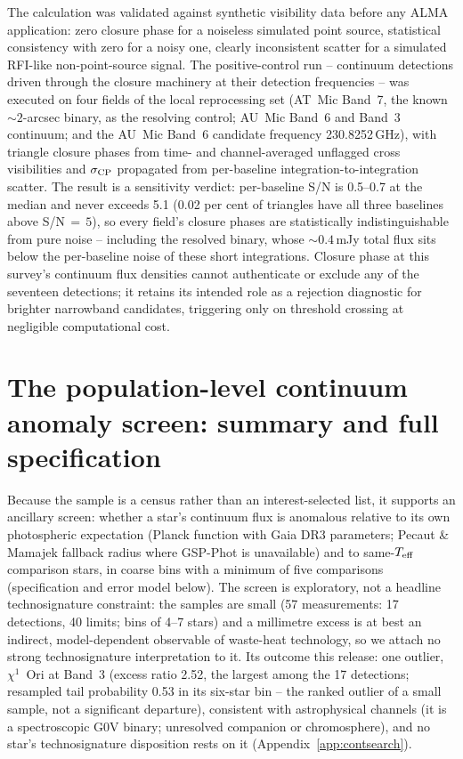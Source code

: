 \documentclass{openjournal}
\begin{document}
The calculation was validated against synthetic visibility data
before any ALMA application: zero closure phase for a noiseless
simulated point source, statistical consistency with zero for a noisy
one, clearly inconsistent scatter for a simulated RFI-like
non-point-source signal. The positive-control run -- continuum
detections driven through the closure machinery at their detection
frequencies -- was executed on four fields of the local reprocessing
set (AT~Mic Band~7, the known ${\sim}2$-arcsec binary, as the
resolving control; AU~Mic Band~6 and Band~3 continuum; and the AU~Mic
Band~6 candidate frequency 230.8252\,GHz), with triangle closure
phases from time- and channel-averaged unflagged cross visibilities
and $\sigma_{\rm CP}$ propagated from per-baseline
integration-to-integration scatter. The result is a sensitivity
verdict: per-baseline S/N is 0.5--0.7 at the median and never exceeds
5.1 (0.02 per cent of triangles have all three baselines above
S/N$\,{=}\,5$), so every field's closure phases are statistically
indistinguishable from pure noise -- including the resolved binary,
whose ${\sim}0.4$\,mJy total flux sits below the per-baseline noise of
these short integrations. Closure phase at this survey's continuum
flux densities cannot authenticate or exclude any of the seventeen
detections; it retains its intended role as a rejection diagnostic for
brighter narrowband candidates, triggering only on threshold crossing
at negligible computational cost.

\section{The population-level continuum anomaly screen: summary and full specification}
\label{app:continuum}

Because the sample is a census rather than an interest-selected list,
it supports an ancillary screen: whether a star's continuum flux is
anomalous relative to its own photospheric expectation (Planck
function with Gaia DR3 parameters; Pecaut \& Mamajek fallback radius
where GSP-Phot is unavailable) and to same-$T_{\rm eff}$ comparison
stars, in coarse bins with a minimum of five comparisons
(specification and error model below). The
screen is exploratory, not a headline technosignature constraint: the
samples are small (57 measurements: 17 detections, 40 limits; bins of
4--7 stars) and a millimetre excess is at best an indirect,
model-dependent observable of waste-heat technology, so we attach no
strong technosignature interpretation to it. Its outcome this
release: one outlier, $\chi^1$~Ori at Band~3 (excess ratio 2.52, the
largest among the 17 detections; resampled tail probability 0.53 in
its six-star bin -- the ranked outlier of a small sample, not a
significant departure), consistent with astrophysical channels (it is
a spectroscopic G0V binary; unresolved companion or chromosphere),
and no star's technosignature disposition rests on it
(Appendix~\ref{app:contsearch}).
\end{document}
